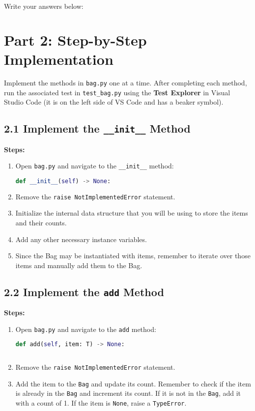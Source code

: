 \documentclass[12pt]{article}
\begin{document}
\noindent Write your answers below:

\vspace{4\baselineskip}


\section*{Part 2: Step-by-Step Implementation}

Implement the methods in \texttt{bag.py} one at a time. After completing each method, run the associated test in \texttt{test\_bag.py} using the \textbf{Test Explorer} in Visual Studio Code (it is on the left side of VS Code and has a beaker symbol).

\subsection*{2.1 Implement the \texttt{\_\_init\_\_} Method}

\textbf{Steps:}
\begin{enumerate}
    \item Open \texttt{bag.py} and navigate to the \texttt{\_\_init\_\_} method:
    \begin{lstlisting}[language=Python]
def __init__(self) -> None:

    \end{lstlisting}
    \item Remove the \texttt{raise NotImplementedError} statement.
    \item Initialize the internal data structure that you will be using to store the items and their counts.
    \item Add any other necessary instance variables.
    \item Since the Bag may be instantiated with items, remember to iterate over those items and manually add them to the Bag.

\end{enumerate}

\subsection*{2.2 Implement the \texttt{add} Method}

\textbf{Steps:}
\begin{enumerate}
    \item Open \texttt{bag.py} and navigate to the \texttt{add} method:
    \begin{lstlisting}[language=Python]
def add(self, item: T) -> None:
    
    \end{lstlisting}
    \item Remove the \texttt{raise NotImplementedError} statement.
    \item Add the item to the \texttt{Bag} and update its count. Remember to check if the item is already in the \texttt{Bag} and increment its count. If it is not in the \texttt{Bag}, add it with a count of 1. If the item is \texttt{None}, raise a \texttt{TypeError}.
\end{enumerate}
\end{document}
